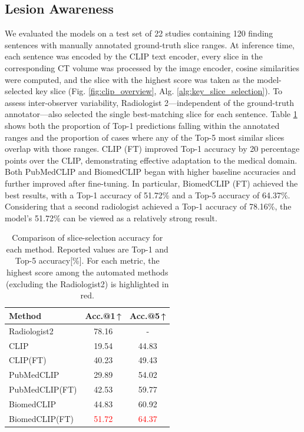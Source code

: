 \documentclass[bioengineering,article,submit,pdftex,moreauthors]{Definitions/mdpi}
\begin{document}
\subsection{Lesion Awareness}\label{sec:lesion_aware}
We evaluated the models on a test set of 22 studies containing 120 finding sentences with manually annotated ground-truth slice ranges. 
At inference time, each sentence was encoded by the CLIP text encoder, every slice in the corresponding CT volume was processed by the image encoder, cosine similarities were computed, and the slice with the highest score was taken as the model-selected key slice (Fig. \ref{fig:clip_overview}, Alg. \ref{alg:key_slice_selection}). 
To assess inter-observer variability, Radiologist 2—independent of the ground-truth annotator—also selected the single best-matching slice for each sentence.
Table \ref{tab:slice_extraction_accuracy} shows both the proportion of Top-1 predictions falling within the annotated ranges and the proportion of cases where any of the Top-5 most similar slices overlap with those ranges. 
CLIP (FT) improved Top-1 accuracy by 20 percentage points over the CLIP, demonstrating effective adaptation to the medical domain.
Both PubMedCLIP and BiomedCLIP began with higher baseline accuracies and further improved after fine-tuning. 
In particular, BiomedCLIP (FT) achieved the best results, with a Top-1 accuracy of 51.72\% and a Top-5 accuracy of 64.37\%. 
Considering that a second radiologist achieved a Top-1 accuracy of 78.16\%, the model’s 51.72\% can be viewed as a relatively strong result.



\begin{table}[ht]
  \centering
  \caption{Comparison of slice-selection accuracy for each method. 
  Reported values are Top-1 and Top-5 accuracy[\%]. 
  For each metric, the highest score among the automated methods (excluding the Radiologist2) is highlighted in red.}
  \label{tab:slice_extraction_accuracy}
  \begin{tabular}{lcc}
    \toprule
    Method                  & Acc.@1\,↑      & Acc.@5\,↑      \\
    \midrule
    Radiologist2            & 78.16       & -           \\
    CLIP                    & 19.54       & 44.83       \\
    CLIP(FT)                & 40.23       & 49.43       \\
    PubMedCLIP              & 29.89       & 54.02       \\
    PubMedCLIP(FT)          & 42.53       & 59.77       \\
    BiomedCLIP              & 44.83       & 60.92       \\
    BiomedCLIP(FT)          & \textcolor{red}{51.72} & \textcolor{red}{64.37} \\
    \bottomrule
  \end{tabular}
\end{table}
\end{document}
